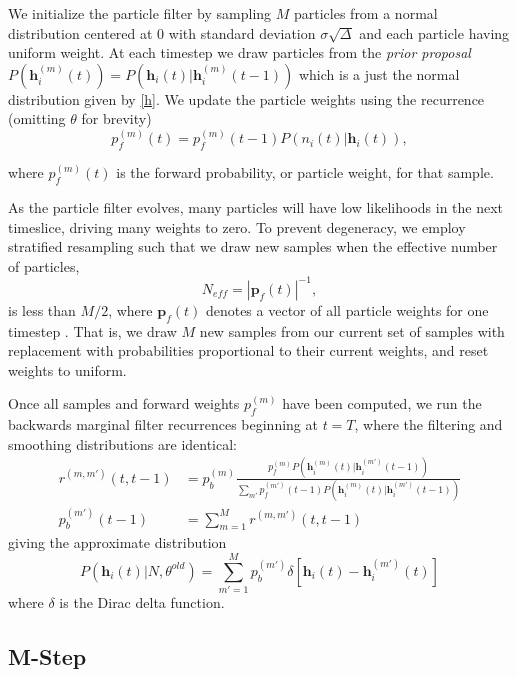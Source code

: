\documentclass{article}
\begin{document}
We initialize the particle filter by sampling $M$ particles from a
normal distribution centered at 0 with standard deviation
$\sigma\sqrt{\Delta}$ and each particle having uniform weight. At each timestep we draw
particles from the \emph{prior proposal}
$P(\mathbf{h}_i^{(m)}(t)) = P(\mathbf{h}_i(t) | \mathbf{h}_i^{(m)}(t - 1))$
which is a just the normal distribution given by \eqref{h}. We update
the particle weights using the recurrence (omitting $\theta$ for brevity)
\begin{equation} \label{pf}
p_f^{(m)}(t) = p_f^{(m)}(t - 1)P(n_i(t) | \mathbf{h}_i(t)),
\end{equation}

where $p_f^{(m)}(t)$ is the forward probability, or particle weight, for that sample.

As the particle filter evolves, many particles will have low
likelihoods in the next timeslice, driving many weights to zero.
To prevent degeneracy, we employ stratified resampling such that we draw new samples when the effective number of particles,
\begin{equation} \label{Neff}
N_{eff} = \left|\mathbf{p}_f(t)\right|^{-1},
\end{equation}
is less than $M/2$, where $\mathbf{p}_f(t)$ denotes a vector of all
particle weights for one timestep \citep{vogelstein2009}. That is,
we draw $M$ new samples from our current set of samples with
replacement with probabilities proportional to their current weights,
and reset weights to uniform.

Once all samples and forward weights $p_f^{(m)}$ have been computed,
we run the backwards marginal filter recurrences beginning at $t=T$,
where the filtering and smoothing distributions are identical:
\begin{align}
r^{(m,m')}(t, t - 1) &= p_b^{(m)}\frac{p_f^{(m)}P(\mathbf{h}_i^{(m)}(t)|\mathbf{h}_i^{(m')}(t - 1))}{\sum_{m'} p_f^{(m')}(t - 1) P(\mathbf{h}_i^{(m)}(t)|\mathbf{h}_i^{(m')}(t - 1))} \\
p_b^{(m')}(t - 1)    &= \sum_{m=1}^M r^{(m,m')}(t, t - 1)
\end{align}
giving the approximate distribution
\begin{equation} \label{Ph}
P(\mathbf{h}_i(t) | N, \theta^{old}) = \sum_{m'=1}^{M} p_b^{(m')} \delta\left[\mathbf{h}_i(t) - \mathbf{h}_i^{(m')}(t)\right]
\end{equation}
where $\delta$ is the Dirac delta function.

\subsection{M-Step}
\end{document}
